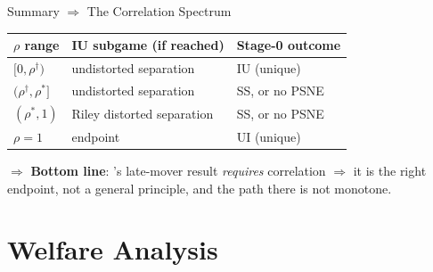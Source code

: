 \documentclass[aspectratio=169, 12pt]{beamer}
\newcommand{\rhosep}{\rho^{*}}
\newcommand{\rhodag}{\rho^{\dagger}}
\begin{document}
\begin{frame}{Summary $\Rightarrow$ The Correlation Spectrum}
  \begin{center}
  \end{center}

  \begin{center}
    \small
    \begin{tabular}{@{}lll@{}}
      \toprule
      $\rho$ range & IU subgame (if reached) & Stage-0 outcome \\
      \midrule
      $[0, \rhodag)$ & undistorted separation & IU (unique) \\
      $(\rhodag, \rhosep]$ & undistorted separation & SS, or no PSNE \\
      $(\rhosep, 1)$ & Riley distorted separation & SS, or no PSNE \\
      $\rho = 1$ & \citet{fu2006} endpoint & UI (unique) \\
      \bottomrule
    \end{tabular}
  \end{center}

  $\Rightarrow$ \textbf{Bottom line}: \citet{fu2006}'s late-mover result
  \emph{requires} correlation $\Rightarrow$ it is the right endpoint,
  not a general principle, and the path there is not monotone.
\end{frame}

\section{Welfare Analysis}
\end{document}
